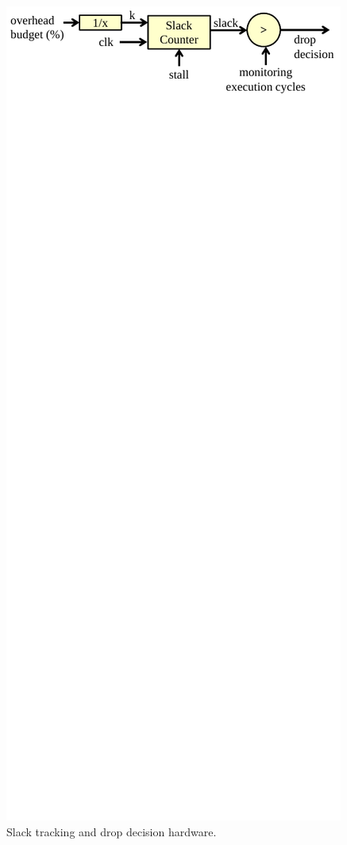 \begin{figure}
  \begin{center}
    \includegraphics[width=\columnwidth]{figs/stm.pdf}
    \vspace{-0.3in}
    \caption{Slack tracking and drop decision hardware.}
    \label{fig:drop.stm}
    \vspace{-0.1in}
  \end{center}
\end{figure}

